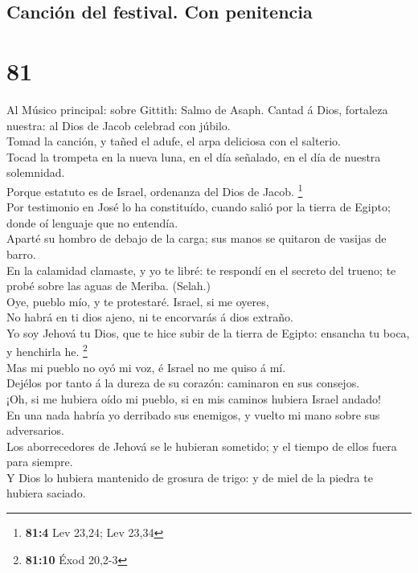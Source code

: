 \hypertarget{canciuxf3n-del-festival.-con-penitencia}{%
\subsection{Canción del festival. Con
penitencia}\label{canciuxf3n-del-festival.-con-penitencia}}

\hypertarget{section-80}{%
\section{81}\label{section-80}}

 Al Músico principal: sobre Gittith: Salmo de Asaph.
Cantad á Dios, fortaleza nuestra: al Dios de Jacob celebrad con
júbilo.\\
 Tomad la canción, y tañed el adufe, el arpa deliciosa con
el salterio.\\
 Tocad la trompeta en la nueva luna, en el día señalado,
en el día de nuestra solemnidad.\\
 Porque estatuto es de Israel, ordenanza del Dios de
Jacob. \footnote{\textbf{81:4} Lev 23,24; Lev 23,34}\\
 Por testimonio en José lo ha constituído, cuando salió
por la tierra de Egipto; donde oí lenguaje que no entendía.\\
 Aparté su hombro de debajo de la carga; sus manos se
quitaron de vasijas de barro.\\
 En la calamidad clamaste, y yo te libré: te respondí en
el secreto del trueno; te probé sobre las aguas de Meriba. (Selah.)\\
 Oye, pueblo mío, y te protestaré. Israel, si me oyeres,\\
 No habrá en ti dios ajeno, ni te encorvarás á dios
extraño.\\
 Yo soy Jehová tu Dios, que te hice subir de la tierra de
Egipto: ensancha tu boca, y henchirla he. \footnote{\textbf{81:10} Éxod
  20,2-3}\\
 Mas mi pueblo no oyó mi voz, é Israel no me quiso á
mí.\\
 Dejélos por tanto á la dureza de su corazón: caminaron
en sus consejos.\\
 ¡Oh, si me hubiera oído mi pueblo, si en mis caminos
hubiera Israel andado!\\
 En una nada habría yo derribado sus enemigos, y vuelto
mi mano sobre sus adversarios.\\
 Los aborrecedores de Jehová se le hubieran sometido; y
el tiempo de ellos fuera para siempre.\\
 Y Dios lo hubiera mantenido de grosura de trigo: y de
miel de la piedra te hubiera saciado.


